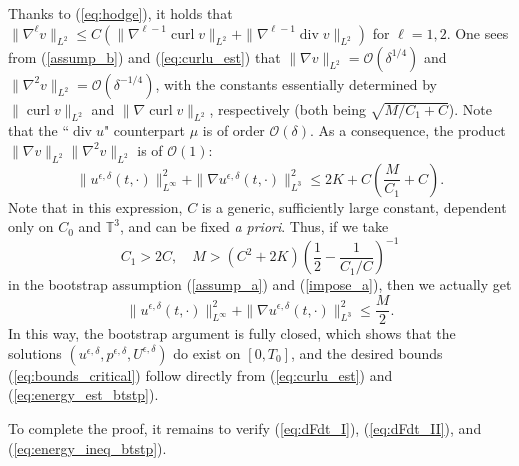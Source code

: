 \documentclass[reqno,10pt]{amsart}
\theoremstyle{definition}
\theoremstyle{remark}
\numberwithin{equation}{section}
\DeclareMathOperator{\dive}{div}
\DeclareMathOperator{\curl}{curl}
\begin{document}
Thanks to (\ref{eq:hodge}), it holds that $\|\nabla^\ell v\|_{L^2}\le C\left(\|\nabla^{\ell-1}\curl v\|_{L^2} + \|\nabla^{\ell-1}\dive v\|_{L^2}\right)$ for $\ell=1,2$. One sees from (\ref{assump_b}) and (\ref{eq:curlu_est}) that $\|\nabla v\|_{L^2} = {\mathcal O}(\delta^{1/4})$ and $\|\nabla^2 v\|_{L^2}={\mathcal O}(\delta^{-1/4})$, with the constants essentially determined by $\|\curl v\|_{L^2}$ and $\|\nabla\curl v\|_{L^2}$, respectively (both being $\sqrt{M/C_1+C}$). Note that the  ``$\dive u$" counterpart $\mu$ is of order ${\mathcal O}(\delta)$. As a consequence, the product $\|\nabla v\|_{L^2} \|\nabla^2 v\|_{L^2}$ is of ${\mathcal O}(1)$:
\[
    \|u^{\epsilon,\delta}(t,\cdot)\|_{L^\infty}^2 + \|\nabla u^{\epsilon,\delta}(t,\cdot)\|_{L^3}^2 \le 2K + C \left( \frac{M}{C_1}+C \right).
\]
Note that in this expression, $C$ is a generic, sufficiently large constant, dependent only on $C_0$ and $\mathbb T^3$, and can be fixed \textit{a priori}. Thus, if we take
\[
    C_1>2C, \quad
    M>(C^2+2K) \left(\frac{1}{2}-\frac{1}{C_1/C}\right)^{-1}
\]
in the bootstrap assumption (\ref{assump_a}) and (\ref{impose_a}), then we actually get
\[
    \|u^{\epsilon,\delta}(t,\cdot)\|_{L^\infty}^2 + \|\nabla u^{\epsilon,\delta}(t,\cdot)\|_{L^3}^2 \le \frac{M}{2}.
\]
In this way, the bootstrap argument is fully closed, which shows that the solutions $(u^{\epsilon,\delta},p^{\epsilon,\delta},U^{\epsilon,\delta})$ do exist on $[0,T_0]$, and the desired bounds (\ref{eq:bounds_critical}) follow directly from (\ref{eq:curlu_est}) and (\ref{eq:energy_est_btstp}).

To complete the proof, it remains to verify (\ref{eq:dFdt_I}), (\ref{eq:dFdt_II}), and (\ref{eq:energy_ineq_btstp}). 
\end{document}
